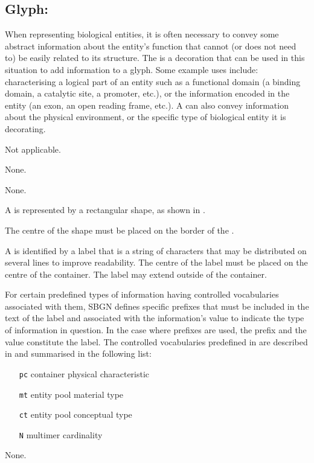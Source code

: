 \subsection{Glyph: }
\label{sec:unitInfo}

When representing biological entities, it is often necessary to convey some abstract information about the entity's function that cannot (or does not need to) be easily related to its structure.
The  is a decoration that can be used in this situation to add information to a glyph.
Some example uses include: characterising a logical part of an entity such as a functional domain (a binding domain, a catalytic site, a promoter, etc.), or the information encoded in the entity (an exon, an open reading frame, etc.).
A  can also convey information about the physical environment, or the specific type of biological entity it is decorating.

\begin{glyphDescription}

\glyphSboTerm
Not applicable.

\glyphIncoming
None.

\glyphOutgoing
None.

\glyphContainer
A  is represented by a rectangular shape, as shown in .

The centre of the shape must be placed on the border of the .

\glyphLabel
A  is identified by a label that is a string of characters that may be distributed on several lines to improve readability.
The centre of the label must be placed on the centre of the container.
The label may extend outside of the container.
  
For certain predefined types of information having controlled vocabularies associated with them, SBGN defines specific prefixes that must be included in the text of the label and associated with the information's value to indicate the type of information in question. In the case where prefixes are used, the prefix and the value constitute the label. The controlled vocabularies predefined in \SBGNPDLone are described in  and summarised in the following list:

\begin{center}
  \begin{itemize}\setlength{\parskip}{0ex}
  \item[\texttt{pc}] container physical characteristic
  \item[\texttt{mt}] entity pool material type
  \item[\texttt{ct}] entity pool conceptual type
  \item[\texttt{N}]  multimer cardinality
  \end{itemize}
  
\end{center}

\glyphAux
None.

\end{glyphDescription}

